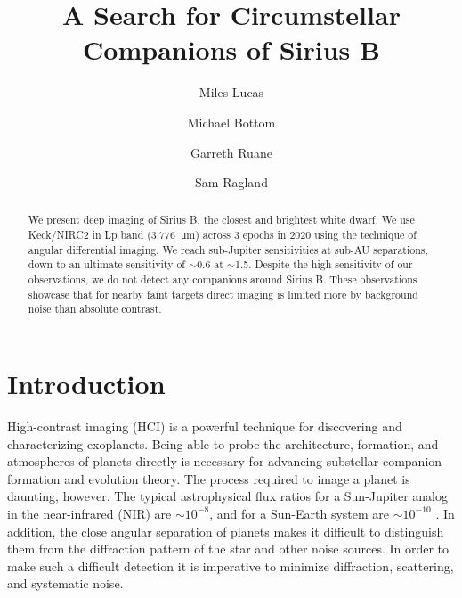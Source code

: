 \documentclass[twocolumn]{aastex631}
\begin{document}
\title{A Search for Circumstellar Companions of Sirius B}



\author[0000-0001-6341-310X]{Miles Lucas}

\author[0000-0003-1341-5531]{Michael Bottom}

\author[0000-0003-4769-1665]{Garreth Ruane}

\author[0000-0002-0696-1780]{Sam Ragland}


\begin{abstract}
We present deep imaging of Sirius B, the closest and brightest white dwarf. We use Keck/NIRC2 in Lp band (\qty{3.776}{\micro\meter}) across 3 epochs in 2020 using the technique of angular differential imaging. We reach sub-Jupiter sensitivities at sub-AU separations, down to an ultimate sensitivity of $\sim$\qty{0.6}{\jupitermass} at $\sim$\qty{1.5}{\au}. Despite the high sensitivity of our observations, we do not detect any companions around Sirius B. These observations showcase that for nearby faint targets direct imaging is limited more by background noise than absolute contrast.
\end{abstract}

\section{Introduction} \label{sec:intro}

High-contrast imaging (HCI) is a powerful technique for discovering and characterizing exoplanets. Being able to probe the architecture, formation, and atmospheres of planets directly is necessary for advancing substellar companion formation and evolution theory. The process required to image a planet is daunting, however. The typical astrophysical flux ratios for a Sun-Jupiter analog in the near-infrared (NIR) are $\sim10^{-8}$, and for a Sun-Earth system are $\sim10^{-10}$ \citep{traub_direct_2010}. In addition, the close angular separation of planets makes it difficult to distinguish them from the diffraction pattern of the star and other noise sources. In order to make such a difficult detection it is imperative to minimize diffraction, scattering, and systematic noise.
\end{document}
